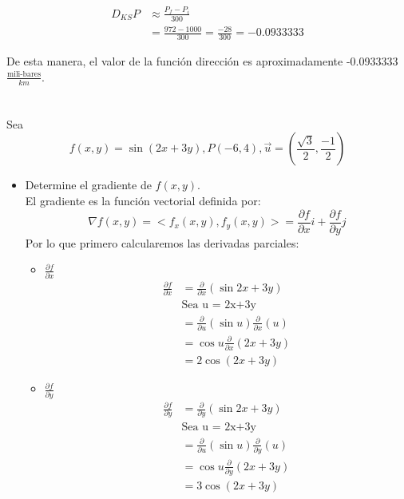 \documentclass[12pt]{article}
\begin{document}
\begin{itemize}[format=\textbf]
\begin{align*}
  D_{KS}P &\approx \frac{P_f - P_i}{300}\\
  &= \frac{972 - 1000}{300} = \frac{-28}{300} = -0.0933333
\end{align*}

De esta manera, el valor de la función dirección es aproximadamente -0.0933333 $\frac{\text{mili-bares}}{km}$.

\section{}

Sea $$f(x, y) = \sin{(2x + 3y)}, P(-6, 4), \vec{u}=\left(\frac{\sqrt{3}}{2},\frac{-1}{2} \right)$$

\begin{itemize}[format=\textbf]

\item Determine el gradiente de $f(x, y)$.\\

  El gradiente es la función vectorial definida por:
  \[
  \nabla f(x,y) = <f_x(x,y), f_y(x,y)> = \frac{\partial f}{\partial x}i + \frac{\partial f}{\partial y}j 
  \]
  Por lo que primero calcularemos las derivadas parciales:

  \begin{itemize}
  \item $\frac{\partial f}{\partial x}$ \\
    
    \begin{align*}
      \frac{\partial f}{\partial x} &=\frac{\partial }{\partial x} \left(\sin{2x+3y}  \right) \\
     &  \text{Sea u = 2x+3y}\\
      &= \frac{\partial }{\partial u} \left(\sin{u}  \right)\frac{\partial }{\partial x} \left(u  \right) \\
      &= \cos{u} \frac{\partial }{\partial x} \left( 2x+3y  \right) \\
      &= 2\cos{(2x+3y)} 
    \end{align*}

   \item $\frac{\partial f}{\partial y}$ \\
    
    \begin{align*}
      \frac{\partial f}{\partial y} &= \frac{\partial }{\partial y} \left(\sin{2x+3y}  \right)\\
      & \text{Sea u = 2x+3y}\\
       &= \frac{\partial }{\partial u} \left(\sin{u}  \right)\frac{\partial }{\partial y} \left(u  \right) \\
       &= \cos{u} \frac{\partial }{\partial y} \left( 2x+3y  \right) \\
      &= 3\cos{(2x+3y)} 
    \end{align*}
   \end{itemize}



\end{itemize}
\end{itemize}
\end{document}
